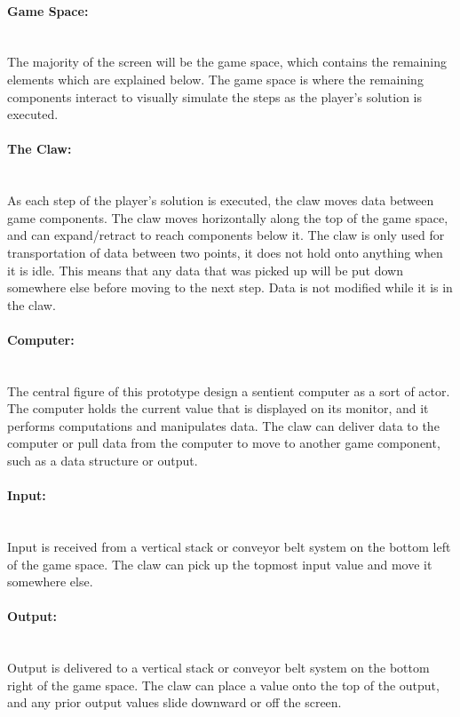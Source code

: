 \paragraph{Game Space:} ~\\
The majority of the screen will be the game space, which contains the remaining elements which are explained below. The game space is where the remaining components interact to visually simulate the steps as the player's solution is executed.


\paragraph{The Claw:} ~\\
As each step of the player's solution is executed, the claw moves data between game components.
The claw moves horizontally along the top of the game space, and can expand/retract to reach components below it.
The claw is only used for transportation of data between two points, it does not hold onto anything when it is idle.
This means that any data that was picked up will be put down somewhere else before moving to the next step. Data is not modified while it is in the claw.


\paragraph{Computer:} ~\\
The central figure of this prototype design a sentient computer as a sort of actor.
The computer holds the current value that is displayed on its monitor, and it performs computations and manipulates data.
The claw can deliver data to the computer or pull data from the computer to move to another game component, such as a data structure or output.


\paragraph{Input:} ~\\
Input is received from a vertical stack or conveyor belt system on the bottom left of the game space.
The claw can pick up the topmost input value and move it somewhere else.


\paragraph{Output:} ~\\
Output is delivered to a vertical stack or conveyor belt system on the bottom right of the game space.
The claw can place a value onto the top of the output, and any prior output values slide downward or off the screen.


